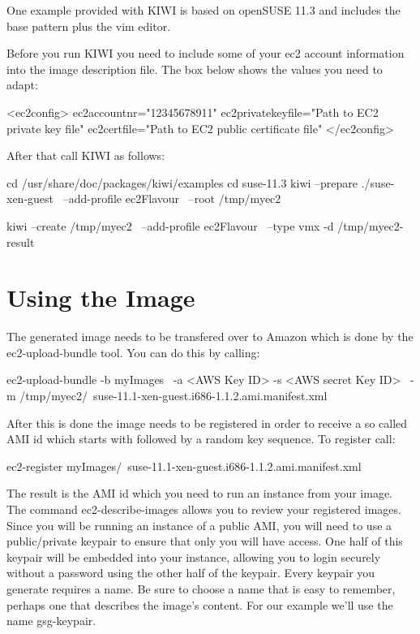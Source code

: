 One example provided with KIWI is based on openSUSE 11.3 and
includes the base pattern plus the vim editor.

Before you run KIWI you need to include some of your ec2 account
information into the image description  file. The box
below shows the values you need to adapt:

\begin{xml}
<ec2config>
  ec2accountnr="12345678911"
  ec2privatekeyfile="Path to EC2 private key file"
  ec2certfile="Path to EC2 public certificate file"
</ec2config>
\end{xml}

After that call KIWI as follows:

\begin{Command}{13cm}
cd /usr/share/doc/packages/kiwi/examples
cd suse-11.3
kiwi --prepare ./suse-xen-guest \
     --add-profile ec2Flavour \
     --root /tmp/myec2
\end{Command}

\begin{Command}{13cm}
kiwi --create /tmp/myec2 \
     --add-profile ec2Flavour \
     --type vmx -d /tmp/myec2-result
\end{Command}

\section{Using the Image}
The generated image needs to be transfered over to Amazon which is
done by the ec2-upload-bundle tool. You can do this by calling:

\begin{Command}{13cm}
ec2-upload-bundle -b myImages \
 -a <AWS Key ID> -s <AWS secret Key ID> \
 -m /tmp/myec2/\
    suse-11.1-xen-guest.i686-1.1.2.ami.manifest.xml
\end{Command}

After this is done the image needs to be registered in order to
receive a so called AMI id which starts with  followed
by a random key sequence. To register call:

\begin{Command}{13cm}
ec2-register myImages/\
    suse-11.1-xen-guest.i686-1.1.2.ami.manifest.xml
\end{Command}

The result is the AMI id which you need to run an instance from
your image. The command ec2-describe-images allows you to review your
registered images. Since you will be running an instance of a public AMI,
you will need to use a public/private keypair to ensure that only you
will have access. One half of this keypair will be embedded into your
instance, allowing you to login securely without a password using the
other half of the keypair. Every keypair you generate requires a name.
Be sure to choose a name that is easy to remember, perhaps one that
describes the image's content. For our example we'll use the name
gsg-keypair.

